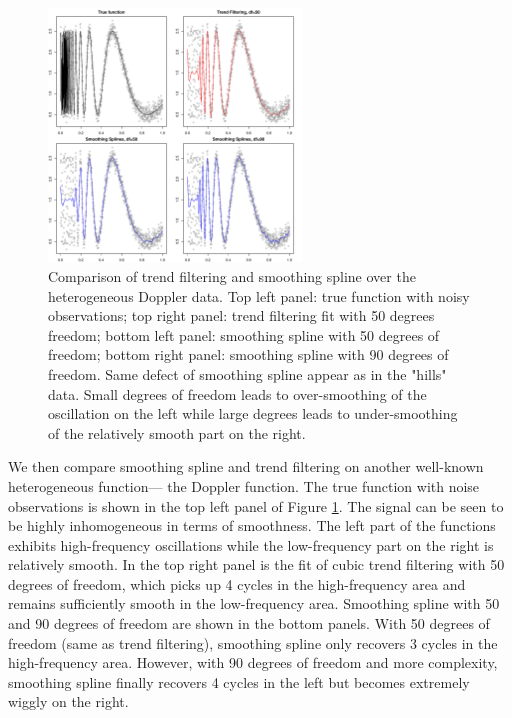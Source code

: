 \documentclass[a4paper]{article}
\begin{document}
\begin{figure}[t]
\centering
\includegraphics[width = 0.6\textwidth]{Figures/Figure5.pdf}
\caption{Comparison of trend filtering and smoothing spline over the heterogeneous Doppler data. Top left panel: true function with noisy observations; top right panel: trend filtering fit with 50 degrees freedom; bottom left panel: smoothing spline with 50 degrees of freedom; bottom right panel: smoothing spline with 90 degrees of freedom. Same defect of smoothing spline appear as in the "hills" data. Small degrees of freedom leads to over-smoothing of the oscillation on the left while large degrees leads to under-smoothing of the relatively smooth part on the right.}
\label{fig:Figure5_ssvstfdoppler}
\end{figure}

We then compare smoothing spline and trend filtering on another well-known heterogeneous function--- the Doppler function. The true function with noise observations is shown in the top left panel of Figure \ref{fig:Figure5_ssvstfdoppler}. The signal can be seen to be highly inhomogeneous in terms of smoothness. The left part of the functions exhibits high-frequency oscillations while the low-frequency part on the right is relatively smooth. In the top right panel is the fit of cubic trend filtering with 50 degrees of freedom, which picks up 4 cycles in the high-frequency area and remains sufficiently smooth in the low-frequency area. Smoothing spline with 50 and 90 degrees of freedom are shown in the bottom panels. With 50 degrees of freedom (same as trend filtering), smoothing spline only recovers 3 cycles in the high-frequency area. However, with 90 degrees of freedom and more complexity, smoothing spline finally recovers 4 cycles in the left but becomes extremely wiggly on the right. 
\end{document}
